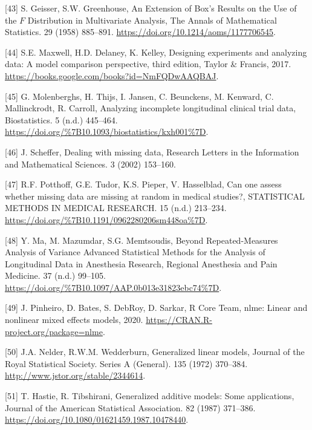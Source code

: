 \documentclass[
]{article}
\begin{document}
\leavevmode\hypertarget{ref-geisser1958}{}%
{[}43{]} S. Geisser, S.W. Greenhouse, An Extension of Box's Results on the Use of the \(F\) Distribution in Multivariate Analysis, The Annals of Mathematical Statistics. 29 (1958) 885--891. \url{https://doi.org/10.1214/aoms/1177706545}.

\leavevmode\hypertarget{ref-maxwell2017}{}%
{[}44{]} S.E. Maxwell, H.D. Delaney, K. Kelley, Designing experiments and analyzing data: A model comparison perspective, third edition, Taylor \& Francis, 2017. \url{https://books.google.com/books?id=NmFQDwAAQBAJ}.

\leavevmode\hypertarget{ref-molenberghs2004}{}%
{[}45{]} G. Molenberghs, H. Thijs, I. Jansen, C. Beunckens, M. Kenward, C. Mallinckrodt, R. Carroll, Analyzing incomplete longitudinal clinical trial data, Biostatistics. 5 (n.d.) 445--464. \url{https://doi.org/\%7B10.1093/biostatistics/kxh001\%7D}.

\leavevmode\hypertarget{ref-scheffer2002}{}%
{[}46{]} J. Scheffer, Dealing with missing data, Research Letters in the Information and Mathematical Sciences. 3 (2002) 153--160.

\leavevmode\hypertarget{ref-potthoff2006}{}%
{[}47{]} R.F. Potthoff, G.E. Tudor, K.S. Pieper, V. Hasselblad, Can one assess whether missing data are missing at random in medical studies?, STATISTICAL METHODS IN MEDICAL RESEARCH. 15 (n.d.) 213--234. \url{https://doi.org/\%7B10.1191/0962280206sm448oa\%7D}.

\leavevmode\hypertarget{ref-ma2012}{}%
{[}48{]} Y. Ma, M. Mazumdar, S.G. Memtsoudis, Beyond Repeated-Measures Analysis of Variance Advanced Statistical Methods for the Analysis of Longitudinal Data in Anesthesia Research, Regional Anesthesia and Pain Medicine. 37 (n.d.) 99--105. \url{https://doi.org/\%7B10.1097/AAP.0b013e31823ebc74\%7D}.

\leavevmode\hypertarget{ref-nlme}{}%
{[}49{]} J. Pinheiro, D. Bates, S. DebRoy, D. Sarkar, R Core Team, nlme: Linear and nonlinear mixed effects models, 2020. \url{https://CRAN.R-project.org/package=nlme}.

\leavevmode\hypertarget{ref-nelder1972}{}%
{[}50{]} J.A. Nelder, R.W.M. Wedderburn, Generalized linear models, Journal of the Royal Statistical Society. Series A (General). 135 (1972) 370--384. \url{http://www.jstor.org/stable/2344614}.

\leavevmode\hypertarget{ref-hastie1987}{}%
{[}51{]} T. Hastie, R. Tibshirani, Generalized additive models: Some applications, Journal of the American Statistical Association. 82 (1987) 371--386. \url{https://doi.org/10.1080/01621459.1987.10478440}.
\end{document}

